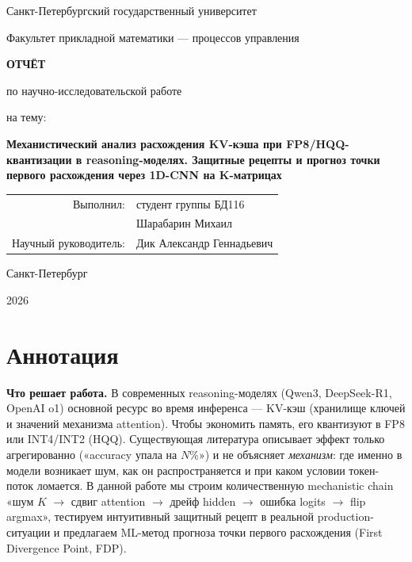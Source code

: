 \documentclass[a4paper,12pt]{article}
\begin{document}
\begin{titlepage}
\centering
\vspace*{1cm}
{\large Санкт-Петербургский государственный университет\par}
{\large Факультет прикладной математики — процессов управления\par}
\vspace{4cm}

{\Large \textbf{ОТЧЁТ}\par}
{\large по научно-исследовательской работе\par}
\vspace{1cm}
{\large на тему:\par}
\vspace{0.5cm}
{\LARGE \textbf{Механистический анализ расхождения KV-кэша при
FP8/HQQ-квантизации в reasoning-моделях. Защитные рецепты и прогноз
точки первого расхождения через 1D-CNN на K-матрицах}\par}

\vspace{3cm}
\begin{flushright}
\begin{tabular}{rl}
Выполнил: & студент группы БД116 \\
          & Шарабарин Михаил \\[0.5cm]
Научный руководитель: & Дик Александр Геннадьевич \\
\end{tabular}
\end{flushright}

\vfill
{\large Санкт-Петербург\par}
{\large 2026\par}
\end{titlepage}

\tableofcontents
\newpage

\section*{Аннотация}

\textbf{Что решает работа.} В современных reasoning-моделях (Qwen3,
DeepSeek-R1, OpenAI o1) основной ресурс во время инференса --- KV-кэш
(хранилище ключей и значений механизма attention). Чтобы экономить
память, его квантизуют в FP8 или INT4/INT2 (HQQ). Существующая
литература описывает эффект только агрегированно («accuracy упала на
$N$\%») и не объясняет \textit{механизм}: где именно в модели возникает
шум, как он распространяется и при каком условии токен-поток ломается.
В данной работе мы строим количественную mechanistic chain «шум $K$
$\to$ сдвиг attention $\to$ дрейф hidden $\to$ ошибка logits $\to$ flip
argmax», тестируем интуитивный защитный рецепт в реальной
production-ситуации и предлагаем ML-метод прогноза точки первого
расхождения (First Divergence Point, FDP).
\end{document}
